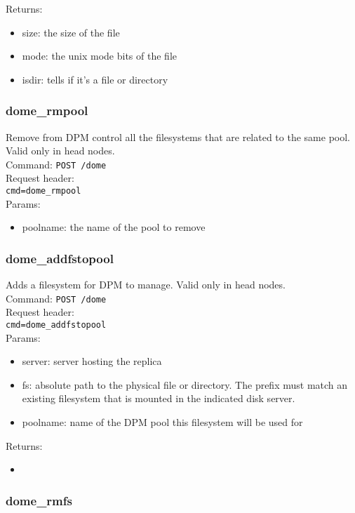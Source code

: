 \documentclass[a4paper,10pt]{scrreprt}
\begin{document}
Returns:
\begin{itemize}
 \item size: the size of the file
 \item mode: the unix mode bits of the file
 \item isdir: tells if it's a file or directory
\end{itemize}
 
 
 
 
\subsubsection{dome\_rmpool}
Remove from DPM control all the filesystems that are related to the same pool. Valid only in head nodes.\\
Command:
\lstinline"POST /dome"\\
Request header:\\
\lstinline"cmd=dome_rmpool"\\
Params:
\begin{itemize}
 \item poolname: the name of the pool to remove
\end{itemize}

 
\subsubsection{dome\_addfstopool}
Adds a filesystem for DPM to manage. Valid only in head nodes.\\
Command:
\lstinline"POST /dome"\\
Request header:\\
\lstinline"cmd=dome_addfstopool"\\
Params:
\begin{itemize}
 \item server: server hosting the replica
 \item fs: absolute path to the physical file or directory. The prefix must match an existing filesystem that is mounted in the indicated disk server.
 \item poolname: name of the DPM pool this filesystem will be used for
\end{itemize}

Returns:
\begin{itemize}
 \item 
\end{itemize}
 
\subsubsection{dome\_rmfs}
\end{document}

